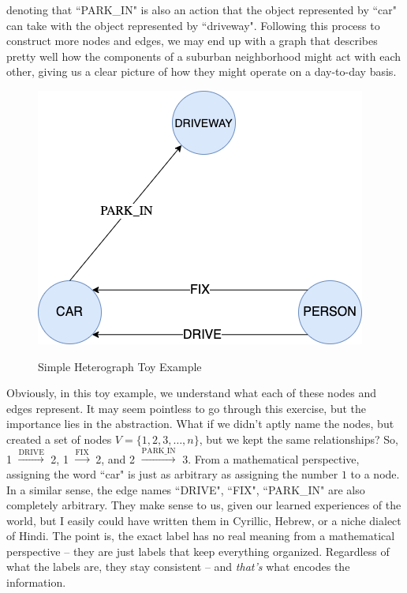 \documentclass{article}
\theoremstyle{definition}
\begin{document}
denoting that ``PARK\_IN" is also an action that the object represented by ``car" can take with the object represented by ``driveway". Following this process to construct more nodes and edges, we may end up with a graph that describes pretty well how the components of a suburban neighborhood might act with each other, giving us a clear picture of how they might operate on a day-to-day basis.

\begin{figure}[hbt!]
\vspace{-0.125in}
\par
\begin{center}
\caption{Simple Heterograph Toy Example}
\vspace{0.1in}
\label{fig:simpleHetGraph}
\includegraphics[scale=0.4]{Figures/SimpleHetGraph.png}
\end{center}
\par
\vspace{-0.25in}
\medskip
\end{figure}

Obviously, in this toy example, we understand what each of these nodes and edges represent. It may seem pointless to go through this exercise, but the importance lies in the abstraction. What if we didn't aptly name the nodes, but created a set of nodes $V = \{1, 2, 3, \dots, n\}$, but we kept the same relationships? So, 1 $\xrightarrow{\text{DRIVE}}$ 2, 1 $\xrightarrow{\text{FIX}}$ 2, and 2 $\xrightarrow{\text{PARK\_IN}}$ 3. From a mathematical perspective, assigning the word ``car" is just as arbitrary as assigning the number $1$ to a node. In a similar sense, the edge names ``DRIVE", ``FIX", ``PARK\_IN" are also completely arbitrary. They make sense to us, given our learned experiences of the world, but I easily could have written them in Cyrillic, Hebrew, or a niche dialect of Hindi. The point is, the exact label has no real meaning from a mathematical perspective -- they are just labels that keep everything organized. Regardless of what the labels are, they stay consistent -- and \textit{that's} what encodes the information.
\end{document}
